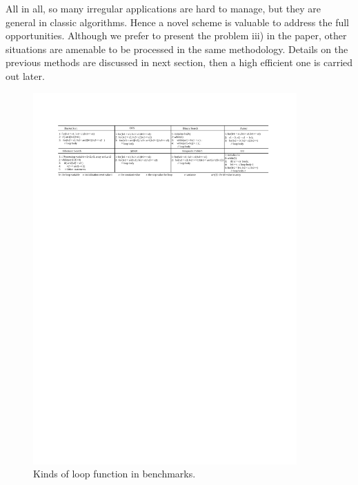 \documentclass[10pt, conference, compsocconf]{IEEEtran}
\begin{document}
%
%
%
%
%

All in all, so many irregular applications are hard to manage, but they are general in classic algorithms. Hence a novel scheme is valuable to address the full opportunities. Although we prefer to present the problem iii) in the paper, other situations are amenable to be processed in the same methodology. Details on the previous methods are discussed in next section, then a high efficient one is carried out later.
\begin{figure}[!t]
	\centering
	\includegraphics[width=0.9\textwidth]{fi/tab.pdf}
	\caption{Kinds of loop function in benchmarks.}
	\label{fig_tab}
\end{figure}
\end{document}
